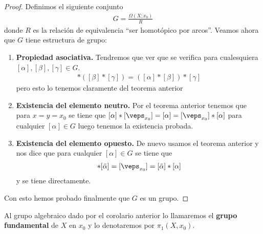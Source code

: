 \begin{teo}
\begin{coro}
        \begin{proof}
            Definimos el siguiente conjunto
            \begin{gather*}
                G = \frac{\Omega(X;x_0)}{R}
            \end{gather*}
            donde $R$ es la relación de equivalencia ``ser homotópico por arcos''. Veamos ahora que $G$ tiene estructura de grupo:
            \begin{enumerate}
                \item \textbf{Propiedad asociativa.} Tendremos que ver que se verifica para cualesquiera $[\alpha],[\beta], [\gamma]\in G$.
                \begin{gather*}
                    [\alpha] \ast ([\beta] \ast [\gamma]) = ([\alpha] \ast [\beta]) \ast [\gamma]
                \end{gather*}
                pero esto lo tenemos claramente del teorema anterior

                \item \textbf{Existencia del elemento neutro.} Por el teorema anterior tenemos que para $x=y=x_0$ se tiene que $[\alpha] \ast [\veps_{x_0}] = [\alpha] = [\veps_{x_0}] \ast [\alpha]$ para cualquier $[\alpha]\in G$ luego tenemos la existencia probada.
                \item \textbf{Existencia del elemento opuesto.} De nuevo usamos el teorema anterior y nos dice que para cualquier $[\alpha]\in G$ se tiene que 
                \begin{gather*}
                    [\alpha] \ast [\tilde{\alpha}] = [\veps_{x_0}] =  [\tilde{\alpha}] \ast [\alpha] 
                \end{gather*}
                y se tiene directamente.
            \end{enumerate}
            Con esto hemos probado finalmente que $G$ es un grupo.
        \end{proof}
    \end{coro}
\end{teo}

\begin{definicion}
    Al grupo algebraico dado por el corolario anterior lo llamaremos el \textbf{grupo fundamental} de $X$ en $x_0$ y lo denotaremos por $\pi_1(X,x_0)$.
\end{definicion}

